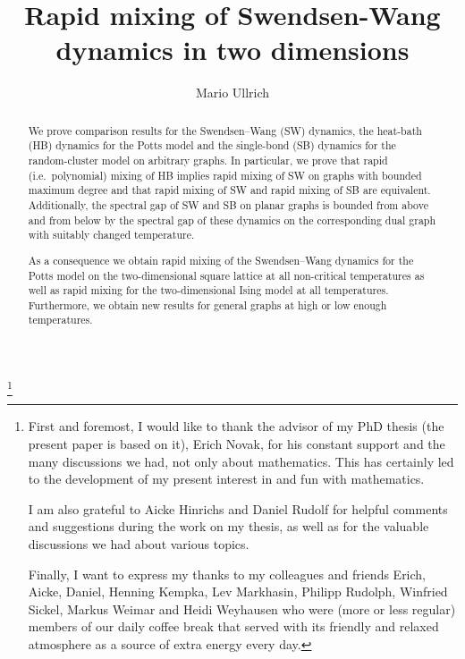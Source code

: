 \documentclass{dis}
\theoremstyle{citing}
\begin{document}
\thanks{
	First and foremost, I would like to thank the advisor of my PhD thesis
	(the present paper is based on it), Erich Novak, 
	for his constant support and the many discussions we had, 
	not only about mathematics. 
	This has certainly led to the development of my present interest in and 
	fun with mathematics.

	I am also grateful to Aicke Hinrichs and Daniel Rudolf for 
	helpful comments and suggestions during the work on my 
	thesis, as well as for the valuable discussions we had about various 
	topics.

	Finally, I want to express my thanks to my colleagues and friends 
	Erich, Aicke, Daniel, 
	Henning Kempka, Lev Markhasin, Philipp Rudolph, 
	Winfried Sickel, Markus Weimar and Heidi Weyhausen 
	who were (more or less regular) members of our daily coffee break 
	that served with its friendly and relaxed atmosphere as a source of 
	extra energy every day.
}


\title{Rapid mixing of Swendsen-Wang dynamics in two dimensions}

\author{Mario Ullrich}
\address{Mathematical Institute\\ Friedrich Schiller University Jena\\
Ernst-Abbe-Platz 2\\ 07743 Jena, Germany\\
E-mail: ullrich.mario@gmail.com}

\maketitledis

\tableofcontents

\begin{abstract}
We prove comparison results for the Swendsen--Wang (SW) dynamics, 
the heat-bath (HB) dynamics for the Potts model and the single-bond 
(SB) dynamics for the random-cluster model on arbitrary graphs.
In particular, we prove that rapid (i.e.~polynomial) mixing of HB 
implies rapid mixing 
of SW on graphs with bounded maximum degree 
and that rapid mixing of SW and rapid mixing of SB are equivalent.
Additionally, the spectral gap of SW and SB on planar 
graphs is bounded from above and from below by the spectral gap 
of these dynamics on the corresponding dual graph with suitably 
changed temperature. 

As a consequence we obtain rapid mixing of the 
Swendsen--Wang dynamics for the Potts model on the two-dimensional 
square lattice at all non-critical temperatures as well as 
rapid mixing for the two-dimensional Ising model at all temperatures. 
Furthermore, we obtain new results for general graphs 
at high or low enough temperatures.
\end{abstract}
\end{document}

